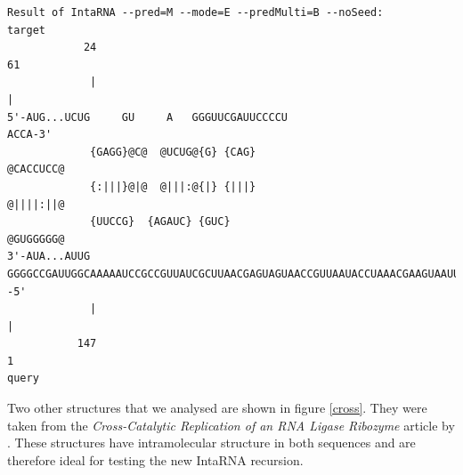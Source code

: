\documentclass[11pt,a4paper]{report}
\begin{document}
\begin{landscape}
\begin{lstlisting}[style=special]
Result of IntaRNA --pred=M --mode=E --predMulti=B --noSeed:
target
            24                                                                                                                                                    61
             |                                                                                                                                                    |
5'-AUG...UCUG     GU     A   GGGUUCGAUUCCCCU                                                                                                                       ACCA-3'
             {GAGG}@C@  @UCUG@{G} {CAG}                                                                                                                               @CACCUCC@
             {:|||}@|@  @|||:@{|} {|||}                                                                                                                               @||||:||@
             {UUCCG}  {AGAUC} {GUC}                                                                                                                               @GUGGGGG@
3'-AUA...AUUG                GGGGCCGAUUGGCAAAAAUCCGCCGUUAUCGCUUAACGAGUAGUAACCGUUAAUACCUAAACGAAGUAAUUGCAGCUAGCGGACUGCUCAACGGACGCGUGGAAACAGGCGGGACAGCUCUGGUCAU       -5'
             |                                                                                                                                                    |
           147                                                                                                                                                    1
query
\end{lstlisting}
\end{landscape}
\noindent
Two other structures that we analysed are shown in figure \ref{cross}. They were taken from the \textit{Cross-Catalytic Replication of an RNA Ligase Ribozyme} article by \cite{doi:10.1016/j.chembiol.2004.08.021}. These structures have intramolecular structure in both sequences and are therefore ideal for testing the new IntaRNA recursion.\\
\end{document}
